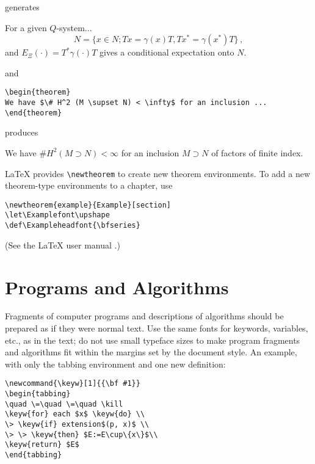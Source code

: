 \noindent generates

\begin{theorem}[Longo, 1998]
For a given $Q$-system...
\[
N = \{x \in N; T x = \gamma (x) T, T x^* = \gamma (x^*) T\}\,,
\]
and $E_\Xi (\cdot) = T^* \gamma (\cdot) T$ gives a conditional
expectation onto $N$.
\end{theorem}

\noindent and

\begin{verbatim}
\begin{theorem}
We have $\# H^2 (M \supset N) < \infty$ for an inclusion ...
\end{theorem}
\end{verbatim}

\noindent produces

\begin{theorem}
We have $\# H^2 (M \supset N) < \infty$ for an inclusion $M \supset
N$ of factors of finite index.
\end{theorem}

\LaTeX{} provides \verb|\newtheorem| to create new theorem
environments. To add a new theorem-type environments to a chapter, use

\begin{verbatim}
\newtheorem{example}{Example}[section]
\let\Examplefont\upshape
\def\Exampleheadfont{\bfseries}
\end{verbatim}

(See the \LaTeX{} user manual \cite{lamp94,ams04}.)

\section{Programs and Algorithms}
Fragments of computer programs and descriptions of algorithms should
be prepared as if they were normal text. Use the same fonts for
keywords, variables, etc., as in the text; do not use small typeface
sizes to make program fragments and algorithms fit within the
margins set by the document style. An example, with only the tabbing
environment and one new definition:

\begin{verbatim}
\newcommand{\keyw}[1]{{\bf #1}}
\begin{tabbing}
\quad \=\quad \=\quad \kill
\keyw{for} each $x$ \keyw{do} \\
\> \keyw{if} extension$(p, x)$ \\
\> \> \keyw{then} $E:=E\cup\{x\}$\\
\keyw{return} $E$
\end{tabbing}
\end{verbatim}

